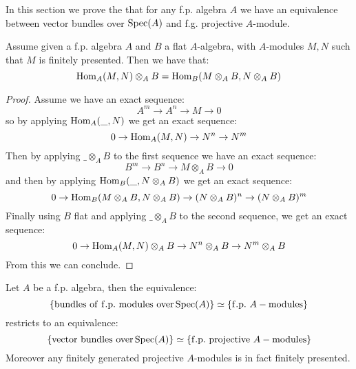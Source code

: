 In this section we prove the that for any f.p. algebra $A$ we have an equivalence between vector bundles over $\operatorname{Spec}(A)$ and f.g. projective $A$-module.

\begin{lemma}\label{localisation-hom}
Assume given a f.p. algebra $A$ and $B$ a flat $A$-algebra, with $A$-modules $M,N$ such that $M$ is finitely presented. Then we have that:
\[ \mathrm{Hom}_A(M,N) \otimes_AB = \mathrm{Hom}_B(M\otimes_AB,N\otimes_AB) \] 
\end{lemma}

\begin{proof}
Assume we have an exact sequence:
\[A^m\to A^n\to M\to 0\]
so by applying $\mathrm{Hom}_A(\_,N)$ we get an exact sequence:
\[0\to \mathrm{Hom}_A(M,N) \to N^n \to N^m\]
Then by applying $\_\otimes_AB$ to the first sequence we have an exact sequence:
\[B^m\to B^n\to M\otimes_AB\to 0\]
and then by applying $\mathrm{Hom}_B(\_,N\otimes_AB)$ we get an exact sequence:
\[0\to \mathrm{Hom}_B(M\otimes_AB,N\otimes_AB) \to (N\otimes_AB)^n \to (N\otimes_AB)^m\]
Finally using $B$ flat and applying $\_\otimes_AB$ to the second sequence, we get an exact sequence:
\[0\to \mathrm{Hom}_A(M,N)\otimes_AB \to N^n \otimes_AB \to N^m\otimes_AB\]
From this we can conclude.
\end{proof}

\begin{proposition}
Let $A$ be a f.p. algebra, then the equivalence:
\[\{\mathrm{bundles\ of\ f.p.\ modules\ over} \operatorname{Spec}(A)\} \simeq \{\mathrm{f.p.}\ A-\mathrm{modules}\}\] 
restricts to an equivalence:
\[\{\mathrm{vector\ bundles\ over} \operatorname{Spec}(A)\} \simeq \{\mathrm{f.p.\ projective}\ A-\mathrm{modules}\}\] 
Moreover any finitely generated projective $A$-modules is in fact finitely presented.
\end{proposition}

